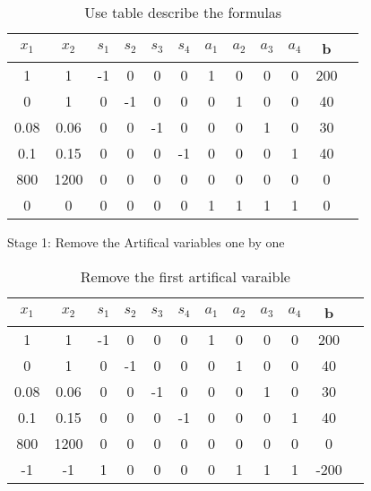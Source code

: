 \documentclass{article}
\begin{document}
  \begin{table}[H]
  \centering
  \caption{Use table describe the formulas}
  \begin{tabular}{|c|c|c|c|c|c|c|c|c|c|c|c|}
  \hline
  $x_1$ & $x_2$ & $s_1$  & $s_2$ & $s_3$ & $s_4$ & $a_1$ & $a_2$ & $a_3$ & $a_4$ & b  \\ \hline
  1    & 1    & -1       & 0    & 0    & 0    & 1    & 0    & 0    & 0 & 200 \\ \hline
  0    & 1    & 0        & -1   & 0    & 0    & 0    & 1    & 0    & 0 & 40  \\ \hline
  0.08 & 0.06 & 0        & 0    & -1   & 0    & 0    & 0    & 1    & 0 & 30  \\ \hline
  0.1  & 0.15 & 0        & 0    & 0    & -1   & 0    & 0    & 0    & 1 & 40  \\ \hline
  800  & 1200 & 0        & 0    & 0    & 0    & 0    & 0    & 0    & 0 & 0   \\ \hline
  0    & 0    & 0        & 0    & 0    & 0    & 1    & 1    & 1    & 1 & 0   \\ \hline
  \end{tabular}
  \end{table}
 
  Stage 1: Remove the Artifical variables one by one

  \begin{table}[H]
  \centering
  \caption{Remove the first artifical varaible}
  \begin{tabular}{|c|c|c|c|c|c|c|c|c|c|c|c|}
  \hline
  $x_1$ & $x_2$ & $s_1$  & $s_2$ & $s_3$ & $s_4$ & $a_1$ & $a_2$ & $a_3$ & $a_4$ & b  \\ \hline
  1    & 1    & -1       & 0    & 0    & 0    & 1    & 0    & 0    & 0 & 200 \\ \hline
  0    & 1    & 0        & -1   & 0    & 0    & 0    & 1    & 0    & 0 & 40  \\ \hline
  0.08 & 0.06 & 0        & 0    & -1   & 0    & 0    & 0    & 1    & 0 & 30  \\ \hline
  0.1  & 0.15 & 0        & 0    & 0    & -1   & 0    & 0    & 0    & 1 & 40  \\ \hline
  800  & 1200 & 0        & 0    & 0    & 0    & 0    & 0    & 0    & 0 & 0   \\ \hline
  -1   & -1   & 1        & 0    & 0    & 0    & 0    & 1    & 1    & 1 & -200    \\ \hline
  \end{tabular}
  \end{table}
\end{document}
